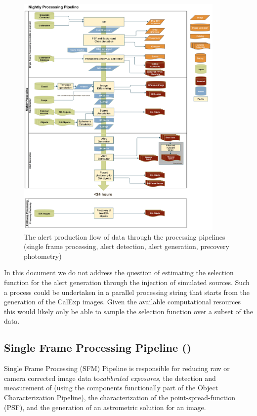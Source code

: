 \begin{figure}[th]
\begin{center}
\includegraphics[width=0.9\textwidth]{figures/Level_1_Processing_Flowchart.jpg}
\caption{\label{fig:nightly} The alert production flow of data through the processing pipelines (single frame processing, alert detection,  alert generation, precovery photometry) }
\end{center}
\end{figure}

In this document we do not address the question of estimating the selection function for the alert generation through the injection of simulated sources. Such a process could be undertaken in a parallel processing string that starts from the generation of the CalExp images. Given the available computational resources  this would likely only be able to sample the selection function over a subset of the data.

\subsection{Single Frame Processing Pipeline (\wbsSFM)}
\label{sec:apSingleFrameProcessing}

Single Frame Processing (SFM) Pipeline is responsible for reducing raw or camera corrected image data to\emph{calibrated exposures}, the detection and measurement of \Sources (using the components functionally  part of the Object Characterization Pipeline), the characterization of the point-spread-function (PSF), and the generation of an astrometric solution for an image.

